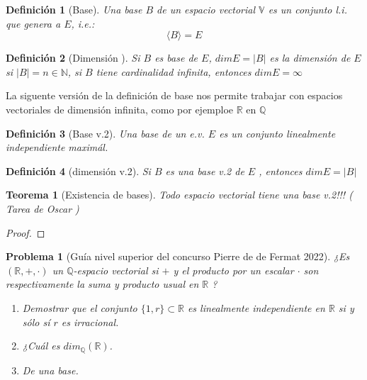 \documentclass[14pt]{extarticle} %
\newtheorem{definicion}{Definición}
\newtheorem{teorema}{Teorema}
\theoremstyle{problemastyle} %
\newtheorem{problema}{Problema}
\newcommand{\evV}{\mathbb{V}} %
\newcommand{\bb}[1]{\mathbb{#1}}
\begin{document}
\begin{definicion}[Base]
    Una base $B$ de un espacio vectorial $\evV$ es un conjunto l.i. que genera a $E$, i.e.:
    $$\langle B \rangle = E$$
\end{definicion}

\begin{definicion}[Dimensión ]
    Si $B$ es base de $E$, $dim E = |B|$ es la dimensión de $E$ si $|B|=n\in \mathbb{N}$, si $B$ tiene cardinalidad infinita, entonces $dim E = \infty$
\end{definicion}

La siguente versión de la definición de base nos permite trabajar con espacios vectoriales de dimensión infinita, como por ejemploe $\mathbb{R}$ en $\mathbb{Q}$
\begin{definicion}[Base v.2]
   Una base de un e.v. $E$ es un conjunto linealmente independiente maximál.
\end{definicion}

\begin{definicion}[dimensión v.2]
    Si $B$ es una base v.2 de $E$ , entonces $dim E = |B|$
\end{definicion}

\begin{teorema}[Existencia de bases]
\label{existencia de bases}
    Todo espacio vectorial tiene una base v.2!!! ( Tarea de Oscar )
\end{teorema}
\begin{proof}
    \todo{}
\end{proof}

\begin{problema}[Guía nivel superior del concurso Pierre de de Fermat 2022]
    ¿Es $(\bb R, +, \cdot)$ un $\bb Q$-espacio vectorial si $+$ y el producto por un escalar $\cdot$ son respectivamente la suma y producto usual en $\bb R$ ?
    \begin{enumerate}
        \item Demostrar que el conjunto $\{1,r\} \subset \bb R$ es linealmente independiente en $\bb R$ si y sólo sí $r$ es irracional.
        \item ¿Cuál es $dim_{\bb Q}(\bb R)$.
        \item De una base.
    \end{enumerate}
\end{problema}
\end{document}
